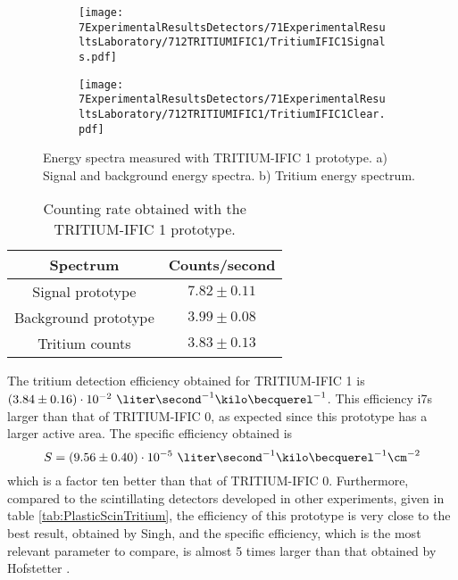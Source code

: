 \begin{figure}
\centering
    \begin{subfigure}[b]{1\textwidth}
    \centering
    \texttt{[image: 7ExperimentalResultsDetectors/71ExperimentalResultsLaboratory/712TRITIUMIFIC1/TritiumIFIC1Signals.pdf]}  
    \caption{\label{subfig:SignalBackgroundEnergySpectraTritiumIFIC1}}
    \end{subfigure}
    \hfill
    \begin{subfigure}[b]{1\textwidth}
    \centering
    \texttt{[image: 7ExperimentalResultsDetectors/71ExperimentalResultsLaboratory/712TRITIUMIFIC1/TritiumIFIC1Clear.pdf]}  
    \caption{\label{subfig:TritiumEnergySpectraTritiumIFIC1}}
    \end{subfigure}
 \caption{Energy spectra measured with TRITIUM-IFIC 1 prototype. a) Signal and background energy spectra. b) Tritium energy spectrum.}
 \label{fig:EnergySpectraTRITIUMIFIC1}
\end{figure}

\begin{table}[htbp]
\centering{}%
\begin{tabular}{cc}
\toprule 
Spectrum & Counts/second \tabularnewline
\midrule
\midrule 
Signal prototype & $7.82 \pm 0.11$ \tabularnewline
Background prototype & $3.99 \pm 0.08$ \tabularnewline  
Tritium counts & $3.83 \pm 0.13$ \tabularnewline
\bottomrule
\end{tabular}
\caption{Counting rate obtained with the TRITIUM-IFIC 1 prototype.}
\label{tab:CountsPerSecondTRITIUMIFIC1}
\end{table}

The tritium detection efficiency obtained for TRITIUM-IFIC 1 is $(3.84 \pm 0.16)\cdot{} 10^{-2}~\liter\second^{-1}\kilo\becquerel^{-1}$. This efficiency i7s larger than that of TRITIUM-IFIC 0, as expected since this prototype has a larger active area. The specific efficiency obtained is
$$S=(9.56 \pm 0.40)\cdot{} 10^{-5}~\liter\second^{-1}\kilo\becquerel^{-1}\cm^{-2}$$
which is a factor ten better than that of TRITIUM-IFIC 0. Furthermore, compared to the scintillating detectors developed in other experiments, given in table \ref{tab:PlasticScinTritium}, the efficiency of this prototype is very close to the best result, obtained by Singh, and the specific efficiency, which is the most relevant parameter to compare, is almost 5 times larger than that obtained by Hofstetter \cite{Hofstetter1, Hofstetter2}.